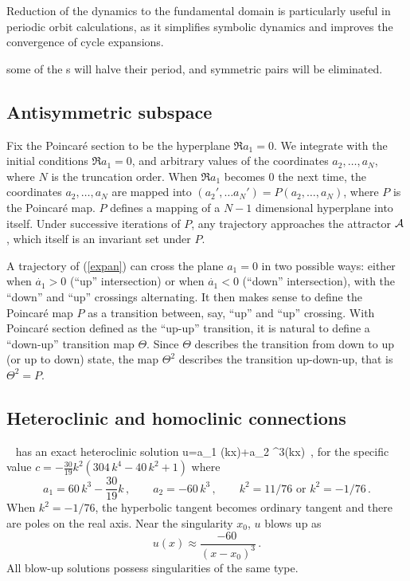 \bigskip

Reduction of the dynamics to the fundamental domain is particularly
useful in periodic orbit calculations, as it simplifies symbolic dynamics
and improves the convergence of cycle expansions\cite{CvitaEckardt}.

some of the \po s will
halve their period, and symmetric pairs will be eliminated.

\subsection*{Antisymmetric subspace}

Fix the  Poincar\'e section to be the hyperplane
$\Re a_1=0$. We integrate  with the initial
 conditions
$\Re a_1=0$, and arbitrary values of the coordinates  $a_2, \ldots, a_N$, where
$N$ is the truncation order.  When $\Re a_1$ becomes
$0$ the next time,  the coordinates  $a_2, \ldots, a_N$ are mapped
into $(a_2', \ldots a_N')=P(a_2, \ldots, a_N)$, where $P$ is the  Poincar\'e
map. $P$ defines a mapping of a $N-1$ dimensional hyperplane into itself.
Under successive iterations of  $P$, any trajectory
approaches the attractor ${\cal A}$, which itself is an invariant
set under $P$.

A trajectory of
 (\ref{expan}) can cross the plane $a_1=0$ in two possible ways:
 either when
$\dot{a_1}>0$ (``up'' intersection)
or when  $\dot{a_1}<0$ (``down'' intersection),
 with the ``down'' and ``up'' crossings
alternating.
It then makes sense to define the  Poincar\'e map $P$ as a transition between,
say, ``up'' and ``up'' crossing.
With  Poincar\'e section defined as the ``up-up'' transition,
it is natural to define a ``down-up'' transition map $\Theta$. Since
$\Theta$ describes the transition from down to up (or up to down) state,
the map $\Theta^2$ describes the transition  up-down-up, that is
$\Theta^2=P$.


\subsection*{Heteroclinic and homoclinic connections}
%

\KSe\  has an exact heteroclinic solution
\beq
u=a_1 \tanh(kx)+a_2 \tanh^3(kx)
\label{eq:ksexa}
\,,
\eeq
for the specific value $c=-\frac{30}{19}k^2(304\,k^4-40\,k^2+1)$ where
\[
a_1=60\,k^3-\frac{30}{19}k
    \,,\qquad
a_2=-60\,k^3
    \,,\qquad
k^2=11/76 \mbox{ or }
k^2=-1/76
\,.
\]
When $k^2=-1/76$, the hyperbolic tangent becomes ordinary tangent and there are poles on
the real axis. Near the singularity $x_0$, $u$ blows up as
\[
u(x) \approx \frac{-60~}{(x-x_0)^3}
\,.
\]
All blow-up solutions possess singularities of the same type.

